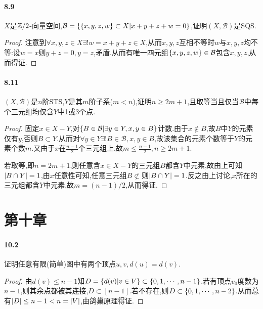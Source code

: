\documentclass{article}
\begin{document}
\paragraph{8.9}$X$是$\mathbb{Z}/2$-向量空间,$\mathcal{B}=\left\{\left\{x,y,z,w\right\}\subset X|x+y+z+w=0\right\}$,证明$(X,\mathcal{B})$是SQS.
\begin{proof}
    注意到$\forall x,y,z\in X\exists! w=x+y+z\in X$,从而$x,y,z$互相不等时$w$与$x,y,z$均不等:设$w=x$则$y+z=0,y=z$,矛盾.从而有唯一四元组$\left\{x,y,z,w\right\}\in \mathcal{B}$包含$x,y,z$,从而得证.
\end{proof}

\paragraph{8.11}$(X,\mathcal{B})$是$n$阶STS,$Y$是其$m$阶子系($m<n$),证明$n\geq 2m+1$,且取等当且仅当$\mathcal{B}$中每个三元组均仅含$Y$中1或3个点.
\begin{proof}
    固定$x\in X-Y$,对$\left\{B\in \mathcal{B}|\exists y\in Y, x,y\in B\right\}$计数.由于$x\notin B$,故$B$中$Y$的元素仅有$y$,否则$B\subset Y$.从而对$\forall y\in Y\exists! B\in \mathcal{B}, x,y\in B$,故该集合的元素个数等于$Y$的元素个数$m$.又由于$x$在$\frac{n-1}{2}$个三元组上,故$m\leq\frac{n-1}{2}, n\geq 2m+1$.

    若取等,即$n=2m+1$,则任意含$x\in X-Y$的三元组$B$都含$Y$中元素,故由上可知$\left|B\cap Y\right|=1$,由$x$任意性可知,任意三元组$B\not\subset$则$\left|B\cap Y\right|=1$.反之由上讨论,$x$所在的三元组都含$Y$中元素,故$m=(n-1)/2$,从而得证.
\end{proof}

\section{第十章}
\paragraph{10.2}证明任意有限(简单)图中有两个顶点$u,v, d(u)=d(v)$.
\begin{proof}
    由$d(v)\leq n-1$知$D=\left\{d(v)|v\in V\right\}\subset \left\{0,1,\cdots,n-1\right\}$.若有顶点$v_0$度数为$n-1$,则其余点都被其连接,$D\subset [n-1]$.若不存在,则$D\subset \left\{0,1,\cdots,n-2\right\}$.从而总有$\left|D\right|\leq n-1<n=\left|V\right|$,由鸽巢原理得证.
\end{proof}
\end{document}
